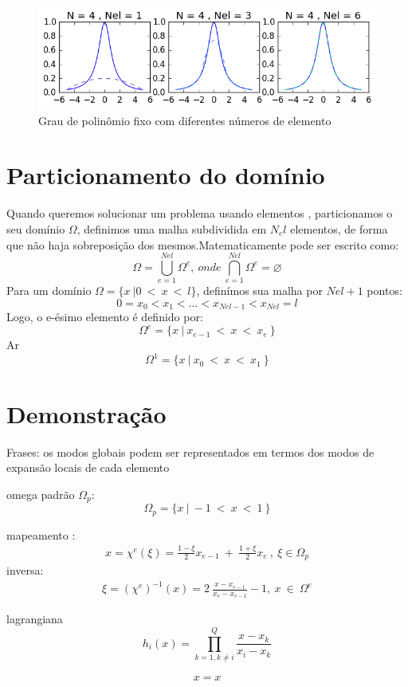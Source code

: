 \begin{figure}[!b]
\includegraphics[width=0.6 \textwidth, center]{figuras/compara_metodo_n2.png}
\caption{Grau de polinômio fixo com diferentes números de elemento}
\end{figure}

\pagebreak
\section{Particionamento do domínio}
 Quando queremos solucionar um problema usando elementos , particionamos o seu domínio $\Omega$, definimos uma malha subdividida em $N_el$ elementos, de forma que não haja sobreposição dos mesmos.Matematicamente pode ser escrito como:\
\begin{equation}
 \Omega  = \bigcup^{Nel}_{e= 1} \Omega^e,\ onde\ \bigcap^{Nel}_{e= 1} \Omega^e = \varnothing
\end{equation}
Para um domínio $ \Omega = \{x\ | 0 \ <\ x\ <\ l  \}$, definímos sua malha por $Nel + 1$ pontos:
\begin{equation}
 0  = x_0 < x_1 < \ldots < x_{Nel - 1} < x_{Nel} = l
\end{equation}
Logo, o e-ésimo elemento é definido por:
\begin{equation}
 \Omega^e = \{x\ |\ x_{e-1}\ <\ x\ <\ x_{e}\ \}
\end{equation}
Ar
\begin{equation}
 \Omega^1 = \{x\ |\ x_{0}\ <\ x\ <\ x_{1}\ \}
\end{equation}



\section{Demonstração}
Frases: os modos globais podem ser representados em termos dos modos de expansão locais de cada elemento




omega padrão $\Omega_p$:
\begin{equation}
	\Omega_p = \{x\ |\ -1\ <\ x\ <\ 1\ \}
\end{equation}


mapeamento :
\begin{align}
x = \chi^e(\xi) = \frac{1-\xi}{2}x_{e-1}\ +\ \frac{1+\xi}{2}x_{e}\ ,\  \xi \in \Omega_{p}
\end{align}
inversa:
\begin{align}
\xi = (\chi^e) ^{-1}(x) = 2\ \frac{x - x_{e-1}}{x_{e} - x_{e-1}} - 1,\ x\ \in \   \Omega^e
\end{align}

lagrangiana
\begin{equation}
	h_i(x) = \prod_{k=1,k\ne i}^Q \frac{x - x_k}{x_i - x_k}
\end{equation}

\begin{align}
	 x = x
\end{align}



